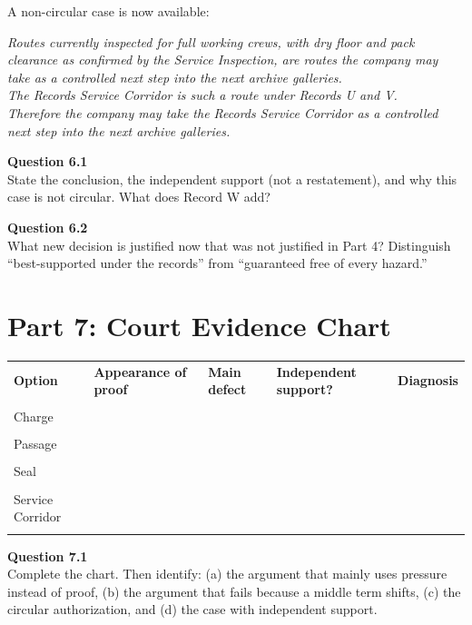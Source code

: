 \documentclass[12pt]{article}
\newcommand{\cluebox}[1]{\par\vspace{0.12em}\noindent\begin{minipage}{\textwidth}\itshape #1\end{minipage}\par\vspace{0.12em}}
\begin{document}
A non-circular case is now available:

\cluebox{Routes currently inspected for full working crews, with dry floor and pack clearance as confirmed by the Service Inspection, are routes the company may take as a controlled next step into the next archive galleries.\\
The Records Service Corridor is such a route under Records U and V.\\
Therefore the company may take the Records Service Corridor as a controlled next step into the next archive galleries.}

\textbf{Question 6.1}\\[-0.15em]
State the conclusion, the independent support (not a restatement), and why this case is not circular. What does Record W add?

\textbf{Question 6.2}\\[-0.15em]
What new decision is justified now that was not justified in Part 4? Distinguish ``best-supported under the records'' from ``guaranteed free of every hazard.''

\newpage
\section*{Part 7: Court Evidence Chart}
\renewcommand{\arraystretch}{1.22}
\begin{tabular}{|p{}|p{}|p{}|p{}|p{}|}
\hline
\textbf{Option} & \textbf{Appearance of proof} & \textbf{Main defect} & \textbf{Independent support?} & \textbf{Diagnosis}\\\\ \hline
Charge & & & & \\\\[0.34in] \hline
Passage & & & & \\\\[0.34in] \hline
Seal & & & & \\\\[0.34in] \hline
Service Corridor & & & & \\\\[0.34in] \hline
\end{tabular}

\textbf{Question 7.1}\\[-0.15em]
Complete the chart. Then identify: (a) the argument that mainly uses pressure instead of proof, (b) the argument that fails because a middle term shifts, (c) the circular authorization, and (d) the case with independent support.
\end{document}
